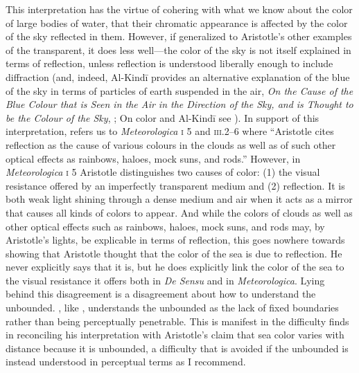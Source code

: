 This interpretation has the virtue of cohering with what we know about the color of large bodies of water, that their chromatic appearance is affected by the color of the sky reflected in them. However, if generalized to Aristotle's other examples of the transparent, it does less well---the color of the sky is not itself explained in terms of reflection, unless reflection is understood liberally enough to include diffraction (and, indeed, Al-Kind\={i} provides an alternative explanation of the blue of the sky in terms of particles of earth suspended in the air, \emph{On the Cause of the Blue Colour that is Seen in the Air in the Direction of the Sky, and is Thought to be the Colour of the Sky}, \citealt[139--143]{Adamson:2012fk}; On color and Al-Kind\=i see \citealt{Adamson:2006ys}). In support of this interpretation, \citet[130]{Sorabji:2004fk} refers us to \emph{Meteorologica} \textsc{i} 5 and \textsc{iii}.2--6 where ``Aristotle cites reflection as the cause of various colours in the clouds as well as of such other optical effects as rainbows, haloes, mock suns, and rods.'' However, in \emph{Meteorologica} \textsc{i} 5 Aristotle distinguishes two causes of color: (1) the visual resistance offered by an imperfectly transparent medium and (2) reflection. It is both weak light shining through a dense medium and air when it acts as a mirror that causes all kinds of colors to appear. And while the colors of clouds as well as other optical effects such as rainbows, haloes, mock suns, and rods may, by Aristotle's lights, be explicable in terms of reflection, this goes nowhere towards showing that Aristotle thought that the color of the sea is due to reflection. He never explicitly says that it is, but he does explicitly link the color of the sea to the visual resistance it offers both in \emph{De Sensu} and in \emph{Meteorologica}. Lying behind this disagreement is a disagreement about how to understand the unbounded. \citet{Sorabji:2004fk}, like \citet{Broackes:1999uq}, understands the unbounded as the lack of fixed boundaries rather than being perceptually penetrable. This is manifest in the difficulty \citet[131]{Sorabji:2004fk} finds in reconciling his interpretation with Aristotle's claim that sea color varies with distance because it is unbounded, a difficulty that is avoided if the unbounded is instead understood in perceptual terms as I recommend.

